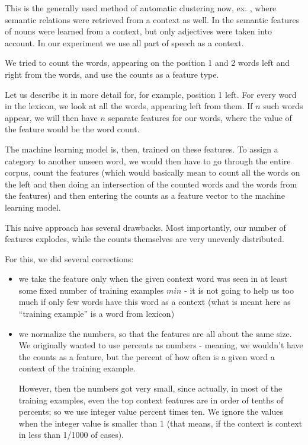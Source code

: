 \documentclass[letterpaper]{article}
\begin{document}
This is  the generally used method of automatic clustering now, ex. \cite{baroni:2009},
where semantic relations were retrieved from a context as well. 
In \cite{biemann05} the semantic features of nouns were learned
from a context, but only adjectives were taken into account.
In our experiment we use all part of speech as a context. 

We tried to count the words, appearing on the position 1 and 2 words left and 
right from the words, and use the counts as a feature type. 

Let us describe it in more detail for, for example,  position 1 left. For every word in the lexicon, we 
look at all the words, appearing left from them. If $n$ such words appear, we will then have $n$ separate 
features for our words, where the value of the feature would be the word count.
 
The machine learning model is, then, trained on these features. To assign a category
to another unseen word, we would then have to go through the entire corpus, count
the features (which would basically mean to count all the words on the left and then doing an 
intersection of the counted words and the words from the features) and then entering the 
counts as a feature vector to the machine learning model.

This naive approach has several drawbacks. Most importantly, our number of features explodes, while the counts themselves are very unevenly distributed.

For this, we did several corrections:
\begin{itemize}
    \item we take the feature only when the given context word was seen in at least some 
fixed number of training examples $min$ - it is not going to help us too much 
if only few words have this word as a context (what is meant here 
as ``training example'' is a word from lexicon)
    
    \item we normalize the numbers, so that the features are all about 
the same size. We originally wanted to use percents as numbers - meaning, 
we wouldn't have the counts as a feature, but the percent of how often is a given word a context of the training example.
    
     However, then the numbers got very small, since actually, 
in most of the training examples, even the top context features are in order of 
tenths of percents; so we use integer value percent times ten. 
We ignore the values when the integer value is smaller than 1 (that means, if the context is context in less than 1/1000 of cases).
     

\end{itemize}
\end{document}
